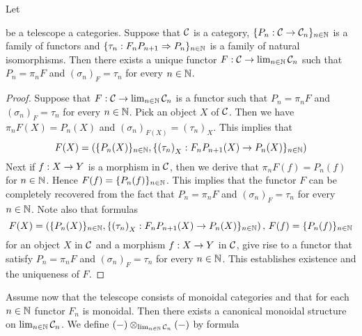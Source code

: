 \begin{theorem}\label{theorem:telescope_2_limits}
Let 
\begin{center}   
\end{center}
be a telescope a categories. Suppose that ${\mathcal C}$ is a category, $\{P_n:{\mathcal C}\rightarrow {\mathcal C}_n\}_{n\in {\mathbb N}}$ is a family of functors and $\{\tau_n:F_nP_{n+1}\Rightarrow P_{n}\}_{n\in {\mathbb N}}$ is a family of natural isomorphisms. Then there exists a unique functor $F:{\mathcal C}\rightarrow \lim_{n\in {\mathbb N}}{\mathcal C}_n$ such that $P_n = \pi_nF$ and $\left(\sigma_n\right)_F = \tau_n$ for every $n\in {\mathbb N}$.
\end{theorem}
\begin{proof}
Suppose that $F:{\mathcal C}\rightarrow \lim_{n\in {\mathbb N}}{\mathcal C}_n$ is a functor such that $P_n = \pi_nF$ and $\left(\sigma_n\right)_F = \tau_n$ for every $n\in {\mathbb N}$. Pick an object $X$ of ${\mathcal C}$. Then we have $\pi_nF(X) = P_n(X)$ and $\left(\sigma_n\right)_{F(X)} = \left(\tau_n\right)_X$. This implies that
$$F(X) = \left(\{P_n(X)\}_{n\in {\mathbb N}},\{\left(\tau_n\right)_X:F_nP_{n+1}(X)\rightarrow P_n(X)\}_{n\in {\mathbb N}}\right)$$
Next if $f:X\rightarrow Y$ is a morphism in ${\mathcal C}$, then we derive that $\pi_nF(f) = P_n(f)$ for $n\in {\mathbb N}$. Hence $F(f) = \{P_n(f)\}_{n\in {\mathbb N}}$. This implies that the functor $F$ can be completely recovered from the fact that $P_n = \pi_nF$ and $\left(\sigma_n\right)_F = \tau_n$ for every $n\in {\mathbb N}$. Note also that formulas
$$F(X) = \left(\{P_n(X)\}_{n\in {\mathbb N}},\{\left(\tau_n\right)_X:F_nP_{n+1}(X)\rightarrow P_n(X)\}_{n\in {\mathbb N}}\right),\,F(f) = \{P_n(f)\}_{n\in {\mathbb N}}$$
for an object $X$ in ${\mathcal C}$ and a morphism $f:X\rightarrow Y$ in ${\mathcal C}$, give rise to a functor that satisfy $P_n = \pi_nF$ and $\left(\sigma_n\right)_F = \tau_n$ for every $n\in {\mathbb N}$. This establishes existence and the uniqueness of $F$.
\end{proof}
\noindent
Assume now that the telescope consists of monoidal categories and that for each $n\in {\mathbb N}$ functor $F_n$ is monoidal. Then there exists a canonical monoidal structure on $\lim_{n\in {\mathbb N}}{\mathcal C}_n$. We define $(-)\otimes_{\lim_{n\in {\mathbb N}}{\mathcal C}_n}(-)$ by formula
